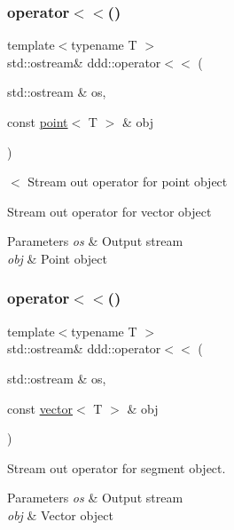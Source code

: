 \subsubsection{\texorpdfstring{operator$<$$<$()}{operator<<()}\hspace{0.1cm}{\footnotesize\ttfamily [1/10]}}
{\footnotesize\ttfamily template$<$typename T $>$ \\
std\+::ostream\& ddd\+::operator$<$$<$ (\begin{DoxyParamCaption}\item[{std\+::ostream \&}]{os,  }\item[{const \hyperlink{classddd_1_1point}{point}$<$ T $>$ \&}]{obj }\end{DoxyParamCaption})\hspace{0.3cm}{\ttfamily [inline]}}



$<$ Stream out operator for point object 

Stream out operator for vector object 
\begin{DoxyParams}{Parameters}
{\em os} & Output stream \\
\hline
{\em obj} & Point object \\
\hline
\end{DoxyParams}
\mbox{\label{namespaceddd_a85783ffbd6985b1981059732d7bbe174}} 
\subsubsection{\texorpdfstring{operator$<$$<$()}{operator<<()}\hspace{0.1cm}{\footnotesize\ttfamily [2/10]}}
{\footnotesize\ttfamily template$<$typename T $>$ \\
std\+::ostream\& ddd\+::operator$<$$<$ (\begin{DoxyParamCaption}\item[{std\+::ostream \&}]{os,  }\item[{const \hyperlink{classddd_1_1vector}{vector}$<$ T $>$ \&}]{obj }\end{DoxyParamCaption})\hspace{0.3cm}{\ttfamily [inline]}}



Stream out operator for segment object. 


\begin{DoxyParams}{Parameters}
{\em os} & Output stream \\
\hline
{\em obj} & Vector object \\
\hline
\end{DoxyParams}
\mbox{\label{namespaceddd_a59e2fa950fd945aa8b3dd550720ad3f5}} 
